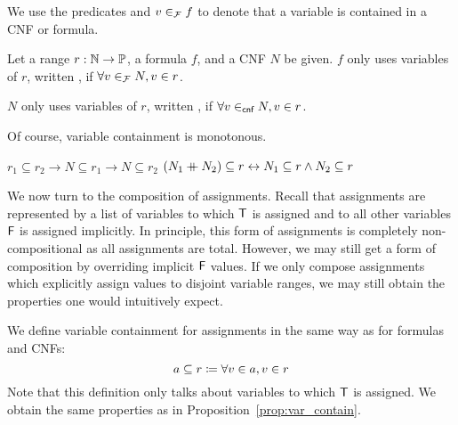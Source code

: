 %
We use the predicates  and $v \in_{\mathcal{F}} f$ to denote that a variable is contained in a CNF or formula.
%

\begin{definition}
  Let a range $r : \mathbb{N} \rightarrow \mathbb{P}$, a formula $f$, and a CNF $N$ be given. 
  $f$ only uses variables of $r$, written , if $\forall v\in_{\mathcal{F}} N, v \in r$.


  $N$ only uses variables of $r$, written , if $\forall v \in_{\textsf{cnf}} N, v \in r$. 
\end{definition}

Of course, variable containment is monotonous. 
\begin{proposition}\label{prop:var_contain}\leavevmode
  \begin{enumerate}
     $r_1 \subseteq r_2 \rightarrow N \subseteq r_1 \rightarrow N \subseteq r_2$
     $(N_1 \mathbin{+\mkern-10mu+} N_2) \subseteq r \leftrightarrow N_1 \subseteq r \land N_2 \subseteq r$
  \end{enumerate}
\end{proposition}

We now turn to the composition of assignments. Recall that assignments are represented by a list of variables to which $\mathsf{T}$ is assigned and to all other variables $\mathsf{F}$ is assigned implicitly. 
In principle, this form of assignments is completely non-compositional as all assignments are total. 
However, we may still get a form of composition by overriding implicit $\mathsf{F}$ values. If we only compose assignments which explicitly assign values to disjoint variable ranges, we may still obtain the properties one would intuitively expect. 

We define variable containment  for assignments in the same way as for formulas and CNFs:
\[a \subseteq r \coloneqq \forall v \in a, v \in r \]
Note that this definition only talks about variables to which $\mathsf{T}$ is assigned.
We obtain the same properties as in Proposition~\ref{prop:var_contain}.

